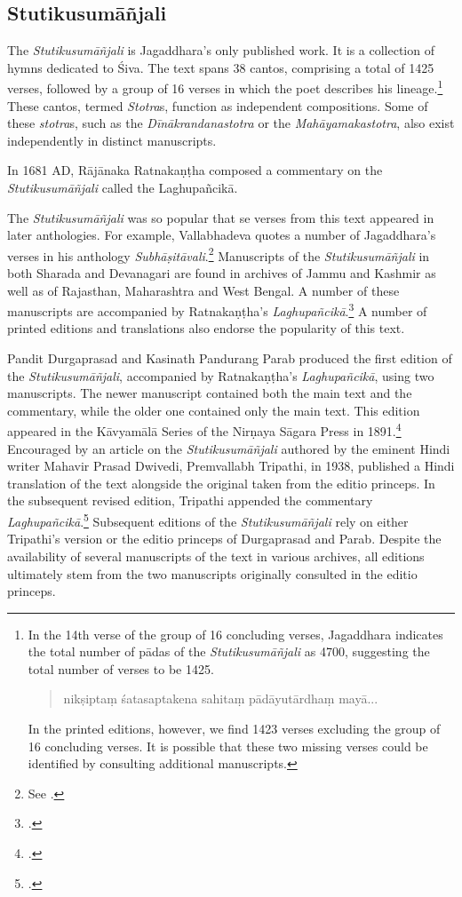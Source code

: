 \subsection{Stutikusumāñjali}

The \emph{Stutikusumāñjali} is Jagaddhara’s only published work. It is a collection of hymns dedicated to Śiva. The text spans 38 cantos, comprising a total of 1425 verses, followed by a group of 16 verses in which the poet describes his lineage.\footnote{
	In the 14th verse of the group of 16 concluding verses, Jagaddhara indicates the total number of pādas of the \emph{Stutikusumāñjali} as 4700, suggesting the total number of verses to be 1425. 
	\begin{quote}
		\textsanskrit{nikṣiptaṃ śatasaptakena sahitaṃ pādāyutārdhaṃ mayā...}\parencite{bibid}
	\end{quote}
	In the printed editions, however, we find 1423 verses excluding the group of 16 concluding verses. It is possible that these two missing verses could be identified by consulting additional manuscripts.
	} 
These cantos, termed \emph{Stotra}s, function as independent compositions. Some of these \emph{stotra}s, such as the \emph{Dīnākrandanastotra} or the \emph{Mahāyamakastotra}, also exist independently in distinct manuscripts.

In 1681 AD, Rājānaka Ratnakaṇṭha composed a commentary on the \emph{Stutikusumāñjali} called the Laghupañcikā. 

The \emph{Stutikusumāñjali} was so popular that se verses from this text appeared in later anthologies. For example, Vallabhadeva quotes a number of Jagaddhara's verses in his anthology \emph{Subhāṣitāvali}.\footnote{See \cite[36--37]{Peterson1886}.} Manuscripts of the \emph{Stutikusumāñjali} in both Sharada and Devanagari are found in archives of Jammu and Kashmir as well as of Rajasthan, Maharashtra and West Bengal. A number of these manuscripts are accompanied by Ratnakaṇṭha's \emph{Laghupañcikā}.\footcite[87]{Stainton2019} A number of printed editions and translations also endorse the popularity of this text. 

Pandit Durgaprasad and Kasinath Pandurang Parab produced the first edition of the \emph{Stutikusumāñjali}, accompanied by Ratnakaṇṭha's \emph{Laghupañcikā}, using two manuscripts. The newer manuscript contained both the main text and the commentary, while the older one contained only the main text. This edition appeared in the Kāvyamālā Series of the Nirṇaya Sāgara Press in 1891.\footcite{Durgaprasad1891} Encouraged by an article on the \emph{Stutikusumāñjali} authored by the eminent Hindi writer Mahavir Prasad Dwivedi, Premvallabh Tripathi, in 1938, published a Hindi translation of the text alongside the original taken from the editio princeps. In the subsequent revised edition, Tripathi appended the commentary \emph{Laghupañcikā}.\footcite{Panta1964} Subsequent editions of the \emph{Stutikusumāñjali} rely on either Tripathi's version or the editio princeps of Durgaprasad and Parab. Despite the availability of several manuscripts of the text in various archives, all editions ultimately stem from the two manuscripts originally consulted in the editio princeps. 

